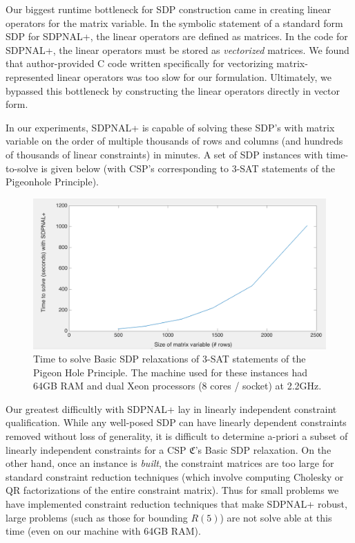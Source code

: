 \documentclass[12pt]{article} %
\begin{document}
Our biggest runtime bottleneck for SDP construction came in creating linear operators for the matrix variable. In the symbolic statement of a standard form SDP for SDPNAL+, the linear operators are defined as matrices. In the code for SDPNAL+, the linear operators must be stored as \textit{vectorized} matrices. We found that author-provided C code written specifically for vectorizing matrix-represented linear operators was too slow for our formulation. Ultimately, we bypassed this bottleneck by constructing the linear operators directly in vector form.

In our experiments, SDPNAL+ is capable of solving these SDP's with matrix variable on the order of multiple thousands of rows and columns (and hundreds of thousands of linear constraints) in minutes. A set of SDP instances with time-to-solve is given below (with CSP's corresponding to 3-SAT statements of the Pigeonhole Principle).

\begin{figure}[htb]
\includegraphics[width=\textwidth]{images/runtime}
\caption{Time to solve Basic SDP relaxations of 3-SAT statements of the Pigeon Hole Principle. The machine used for these instances had 64GB RAM and dual Xeon processors (8 cores / socket) at 2.2GHz.}
\end{figure}

Our greatest difficultly with SDPNAL+ lay in linearly independent constraint qualification. While any well-posed SDP can have linearly dependent constraints removed without loss of generality, it is difficult to determine a-priori a subset of linearly independent constraints for a CSP $\mathfrak{C}$'s Basic SDP relaxation. On the other hand, once an instance is \textit{built}, the constraint matrices are too large for standard constraint reduction techniques (which involve computing Cholesky or QR factorizations of the entire constraint matrix). Thus for small problems we have implemented constraint reduction techniques that make SDPNAL+ robust, large problems (such as those for bounding $R(5)$) are not solve able at this time (even on our machine with 64GB RAM).
\end{document}
